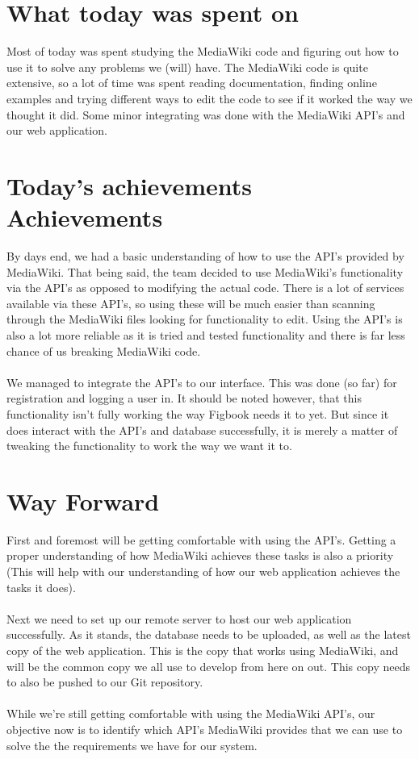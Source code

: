 \documentclass[12pt]{article}
\begin{document}


\newpage

\section{What today was spent on}
\par{Most of today was spent studying the MediaWiki code and figuring out how to use it to solve any problems we (will) have. The MediaWiki code is quite extensive, so a lot of time was spent reading documentation, finding online examples and trying different ways to edit the code to see if it worked the way we thought it did. Some minor integrating was done with the MediaWiki API's and our web application.}

\section{Today's achievements Achievements}
\par{By days end, we had a basic understanding of how to use the API's provided by MediaWiki. That being said, the team decided to use MediaWiki's functionality via the API's as opposed to modifying the actual code. There is a lot of services available via these API's, so using these will be much easier than scanning through the MediaWiki files looking for functionality to edit. Using the API's is also a lot more reliable as it is tried and tested functionality and there is far less chance of us breaking MediaWiki code.\\ \\We managed to integrate the API's to our interface. This was done (so far) for registration and logging a user in. It should be noted however, that this functionality isn't fully working the way Figbook needs it to yet. But since it does interact with the API's and database successfully, it is merely a matter of tweaking the functionality to work the way we want it to.}

\section{Way Forward}
\par{First and foremost will be getting comfortable with using the API's. Getting a proper understanding of how MediaWiki achieves these tasks is also a priority (This will help with our understanding of how our web application achieves the tasks it does).\\ \\Next we need to set up our remote server to host our web application successfully. As it stands, the database needs to be uploaded, as well as the latest copy of the web application. This is the copy that works using MediaWiki, and will be the common copy we all use to develop from here on out. This copy needs to also be pushed to our Git repository.\\ \\While we're still getting comfortable with using the MediaWiki API's, our objective now is to identify which API's MediaWiki provides that we can use to solve the the requirements we have for our system.}
\end{document}
